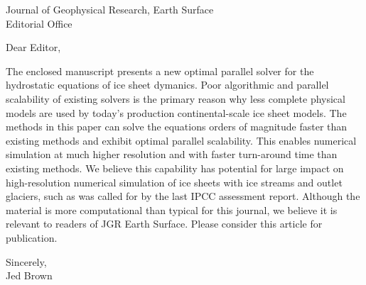 \documentclass[letterpaper]{letter}
\begin{document}
\address{Jed Brown\\VAW A-15\\ETH Zentrum\\8092 Zurich\\Switzerland\\ \url{brown@vaw.baug.ethz.ch}}
\begin{letter}{Journal of Geophysical Research, Earth Surface\\Editorial Office}
\opening{Dear Editor,}

The enclosed manuscript presents a new optimal parallel solver for the hydrostatic equations of ice sheet dymanics.
Poor algorithmic and parallel scalability of existing solvers is the primary reason why less complete physical models are used by today's production continental-scale ice sheet models.
The methods in this paper can solve the equations orders of magnitude faster than existing methods and exhibit optimal parallel scalability.
This enables numerical simulation at much higher resolution and with faster turn-around time than existing methods.
We believe this capability has potential for large impact on high-resolution numerical simulation of ice sheets with ice streams and outlet glaciers, such as was called for by the last IPCC assessment report.
Although the material is more computational than typical for this journal, we believe it is relevant to readers of JGR Earth Surface.
Please consider this article for publication.

\closing{Sincerely,\\
\bigskip
\bigskip
Jed Brown}

\end{letter}
\end{document}
